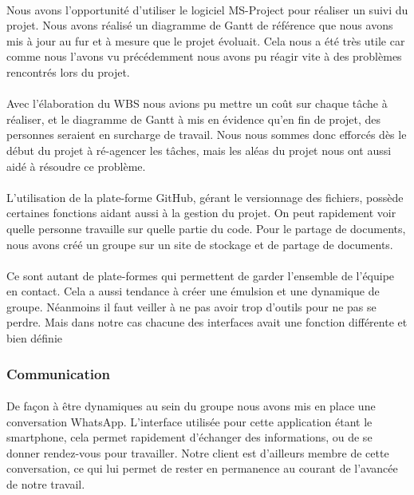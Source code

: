         \paragraph{}
        Nous avons l'opportunité d'utiliser le logiciel MS-Project pour réaliser un suivi du projet. Nous avons réalisé un diagramme de Gantt de référence que nous avons mis à jour au fur et à mesure que le projet évoluait. Cela nous a été très utile car comme nous l'avons vu précédemment nous avons pu réagir vite à des problèmes rencontrés lors du projet.

        \paragraph{}
        Avec l'élaboration du WBS nous avions pu mettre un coût sur chaque tâche à réaliser, et le diagramme de Gantt à mis en évidence qu'en fin de projet, des personnes seraient en surcharge de travail. Nous nous sommes donc efforcés dès le début du projet à ré-agencer les tâches, mais les aléas du projet nous ont aussi aidé à résoudre ce problème.  

        \paragraph{}
        L'utilisation de la plate-forme GitHub, gérant le versionnage des fichiers, possède certaines fonctions aidant aussi à la gestion du projet. On peut rapidement voir quelle personne travaille sur quelle partie du code. Pour le partage de documents, nous avons créé un groupe sur un site de stockage et de partage de documents.

        \paragraph{}
        Ce sont autant de plate-formes qui permettent de garder l'ensemble de l'équipe en contact. Cela a aussi tendance à créer une émulsion et une dynamique de groupe. Néanmoins il faut veiller à ne pas avoir trop d'outils pour ne pas se perdre. Mais dans notre cas chacune des interfaces avait une fonction différente et bien définie

    \subsubsection{Communication}

        \paragraph{}
        De façon à être dynamiques au sein du groupe nous avons mis en place une conversation WhatsApp. L'interface utilisée pour cette application étant le smartphone, cela permet rapidement d'échanger des informations, ou de se donner rendez-vous pour travailler. Notre client est d'ailleurs membre de cette conversation, ce qui lui permet de rester en permanence au courant de l'avancée de notre travail.

